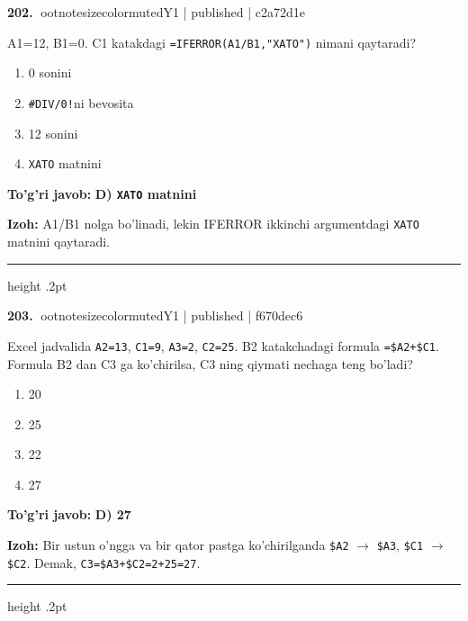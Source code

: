 \documentclass[10pt,a4paper]{article}
\begin{document}
\textbf{\color{ink}202.} {ootnotesizecolor{muted}Y1 | published | c2a72d1e}
\par
A1=12, B1=0. C1 katakdagi \texttt{=IFERROR(A1/B1,"XATO")} nimani qaytaradi?
\begin{enumerate}[label=\Alph*),leftmargin=9mm]
\item 0 sonini
\item \texttt{\#DIV/0!}ni bevosita
\item 12 sonini
\item \texttt{XATO} matnini
\end{enumerate}
\begin{tcolorbox}[enhanced,breakable,colback=teal!4,colframe=teal!55!black,boxrule=0.45pt,arc=1.2mm,left=2.8mm,right=2.8mm,top=2mm,bottom=2mm]
\textbf{\color{teal}To'g'ri javob:} \textbf{D) \texttt{XATO} matnini}
\par\smallskip
\textbf{Izoh:} A1/B1 nolga bo'linadi, lekin IFERROR ikkinchi argumentdagi \texttt{XATO} matnini qaytaradi.
\end{tcolorbox}
\vspace{2mm}\hrule height .2pt\vspace{2mm}

\textbf{\color{ink}203.} {ootnotesizecolor{muted}Y1 | published | f670dec6}
\par
Excel jadvalida \texttt{A2=13}, \texttt{C1=9}, \texttt{A3=2}, \texttt{C2=25}. B2 katakchadagi formula \texttt{=\$A2+\$C1}. Formula B2 dan C3 ga ko'chirilsa, C3 ning qiymati nechaga teng bo'ladi?
\begin{enumerate}[label=\Alph*),leftmargin=9mm]
\item 20
\item 25
\item 22
\item 27
\end{enumerate}
\begin{tcolorbox}[enhanced,breakable,colback=teal!4,colframe=teal!55!black,boxrule=0.45pt,arc=1.2mm,left=2.8mm,right=2.8mm,top=2mm,bottom=2mm]
\textbf{\color{teal}To'g'ri javob:} \textbf{D) 27}
\par\smallskip
\textbf{Izoh:} Bir ustun o'ngga va bir qator pastga ko'chirilganda \texttt{\$A2} \ensuremath{\rightarrow} \texttt{\$A3}, \texttt{\$C1} \ensuremath{\rightarrow} \texttt{\$C2}. Demak, \texttt{C3=\$A3+\$C2=2+25=27}.
\end{tcolorbox}
\vspace{2mm}\hrule height .2pt\vspace{2mm}
\end{document}
